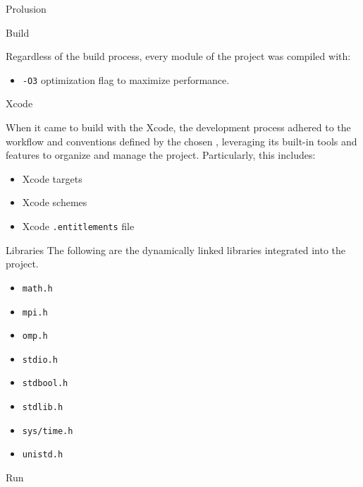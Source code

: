 \begin{chapter}{Prolusion}
\begin{section}{Build}
		\par Regardless of the build process, every module of the project was compiled with:
		\begin{itemize}
			\item \texttt{-O3} optimization flag to maximize performance.
		\end{itemize}
		\begin{subsection}{Xcode}
			\par When it came to build with the Xcode, the development process adhered to the workflow and conventions defined by the chosen , leveraging its built-in tools and features to organize and manage the project. Particularly, this includes:
			\begin{itemize}
				\item Xcode targets
				\item Xcode schemes
				\item Xcode \texttt{.entitlements} file
			\end{itemize}
		\end{subsection}
		\begin{subsection}{Libraries}
			The following are the dynamically linked libraries integrated into the project.
			\begin{itemize}
				\item \texttt{math.h}
				\item \texttt{mpi.h}
				\item \texttt{omp.h}
				\item \texttt{stdio.h}
				\item \texttt{stdbool.h}
				\item \texttt{stdlib.h}
				\item \texttt{sys/time.h}
				\item \texttt{unistd.h}
			\end{itemize}
		\end{subsection}
		\begin{subsection}{Run}
		\end{subsection}
	\end{section}
\end{chapter}